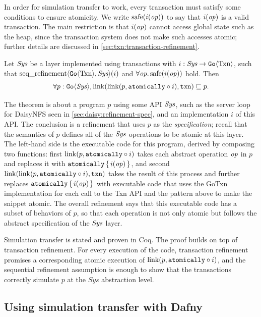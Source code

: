 In order for simulation transfer to work, every transaction must satisfy some
conditions to ensure atomicity. We write $\mathrm{safe}(i(\mathit{op}))$ to say that $i(\mathit{op})$ is a
valid transaction. The main restriction is that $i(\mathit{op})$ cannot access global state
such as the heap, since the transaction system does not make such accesses
atomic; further details are discussed in \cref{sec:txn:transaction-refinement}.

\begin{theorem}
  Let $\textit{Sys}$ be a layer implemented using transactions with
$i : \textit{Sys} \to \mathtt{Go}\langle \mathrm{Txn} \rangle$, such that
$\operatorname{seq\_refinement}\langle \mathtt{Go}\langle \mathrm{Txn} \rangle, \textit{Sys} \rangle(i)$ and
$\forall \mathit{op}.\, \mathrm{safe}(i(\mathit{op}))$ hold. Then
\[
  \forall p : \mathtt{Go}\langle \mathit{Sys} \rangle, \mathrm{link}(\mathrm{link}(p, \mathtt{atomically}\circ i), \texttt{txn}) \sqsubseteq p.
\]
\label{thm:gotxn-transfer}
\end{theorem}
\nopagebreak
The theorem is about a program $p$ using some API $\mathit{Sys}$, such as the server
loop for DaisyNFS seen in \cref{sec:daisy:refinement-spec}, and an
implementation $i$ of this API.\@
The conclusion is a refinement that uses $p$ as the \emph{specification}; recall
that the semantics of $p$ defines all of the $\mathit{Sys}$ operations to be atomic at this
layer. The left-hand side is the executable code for this program, derived by
composing two functions: first $\mathrm{link}(p, \mathtt{atomically}\circ i)$ takes each abstract operation
$\mathit{op}$ in $p$ and replaces it with $\mathtt{atomically}\,\{\, i(\mathit{op}) \,\}$, and second
$\mathrm{link}(\mathrm{link}(p, \mathtt{atomically}\circ i), \texttt{txn})$ takes the result of this process and
further replaces $\mathtt{atomically}\,\{\, i(\mathit{op}) \,\}$ with executable code that uses the GoTxn
implementation for each call to the Txn API and the  pattern above to
make the snippet atomic. The overall refinement says that this executable code
has a subset of behaviors of $p$, so that each operation is not only atomic but
follows the abstract specification of the $\mathit{Sys}$ layer.

Simulation transfer is stated and proven in Coq. The proof builds on top of
transaction refinement. For every execution of the code, transaction refinement promises
a corresponding atomic execution of $\mathrm{link}(p, \mathtt{atomically}\circ i)$, and the
sequential refinement assumption is enough to show that the transactions
correctly simulate $p$ at the $\mathit{Sys}$ abstraction level.

\subsection{Using simulation transfer with Dafny}%
\label{sec:daisy:proof-dafny}

